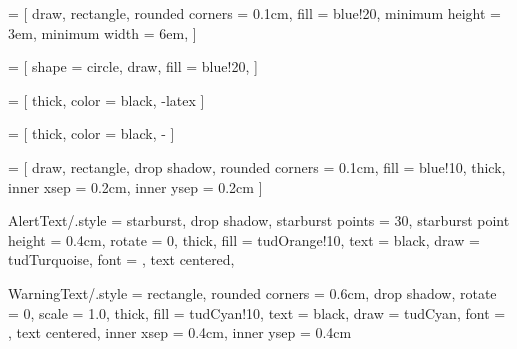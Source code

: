  =
[
	draw,
	rectangle,
	rounded corners	= 0.1cm,
	fill			= blue!20,
	minimum height	= 3em,
	minimum width	= 6em,
]





 =
[
	shape			= circle,
	draw,
	fill			= blue!20,
]




 =
[
	thick,
	color	= black,
	-latex
]




 =
[
	thick,
	color	= black,
	-
]




 =
[
	draw,
	rectangle,
	drop shadow,
	rounded corners	= 0.1cm,
	fill			= blue!10,
	thick,
	inner xsep		= 0.2cm,		%
	inner ysep		= 0.2cm			%
]


\tikzset
{
	AlertText/.style =
	{
		starburst,						%
		drop shadow,
		starburst points = 30,		%
		starburst point height = 0.4cm,	%
		rotate			= 0,			%
		thick,							%
		fill			= tudOrange!10,		%
		text			= black,	%
		draw			= tudTurquoise,			%
		font			= \large,		%
		text centered,					%
	}
}

\tikzset
{
	WarningText/.style =
	{
		rectangle,						%
		rounded corners	= 0.6cm,		%
		drop shadow,
		rotate			= 0,			%
		scale			= 1.0,			%
		thick,							%
		fill			= tudCyan!10,		%
		text			= black,	%
		draw			= tudCyan,			%
		font			= \large,		%
		text centered,					%
		inner xsep		= 0.4cm,		%
		inner ysep		= 0.4cm			%
	}
}


\tikzfading	%
[
	name			= middle,
	top color		= transparent!100,
	bottom color	= transparent!100,
	middle color	= transparent!00,
]

\newcommand{\AlertBox}[2]{
	\begin{tikzpicture}[overlay]
	\node [AlertText] at (#1) {#2};
	\end{tikzpicture}
}

\newcommand{\WarningBox}[2]{
	\begin{tikzpicture}[overlay]
	\node [PropertyText] at (#1) {#2};
	\end{tikzpicture}
}
